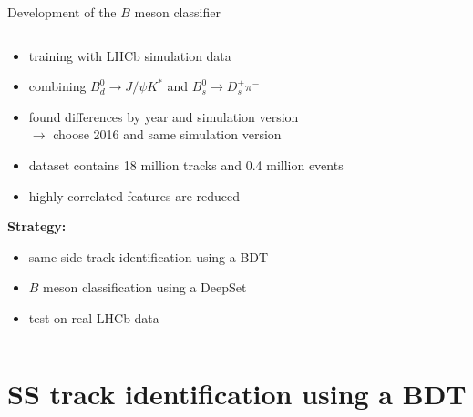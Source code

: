 \documentclass[aspectratio=1610, 10pt]{beamer}
\begin{document}
\begin{frame}{Development of the $B$ meson classifier}
  \centering
  \begin{columns}
    \begin{column}{0.6\textwidth}
      \begin{itemize}
        \item training with LHCb simulation data
        \item combining $B^0_d \rightarrow J/\psi K^*$ and $B^0_s \rightarrow D_s^+ \pi^-$
        \item found differences by year and simulation version \\$\rightarrow$ choose 2016 and same simulation version
        \item dataset contains 18 million tracks and 0.4 million events
        \item highly correlated features are reduced 
      \end{itemize}

      \textbf{Strategy:}
      \begin{itemize}
        \item same side track identification using a BDT
        \item $B$ meson classification using a DeepSet
        \item test on real LHCb data
      \end{itemize}
    \end{column}
  \end{columns}
\end{frame}

\section*{SS track identification using a BDT}
\end{document}
